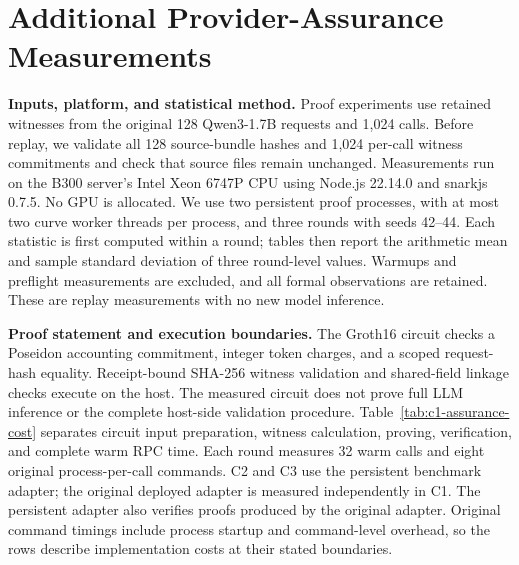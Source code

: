 \section{Additional Provider-Assurance Measurements}
\label{app:c-assurance}

\noindent\textbf{Inputs, platform, and statistical method.}
Proof experiments use retained witnesses from the original 128 Qwen3-1.7B
requests and 1,024 calls. Before replay, we validate all 128 source-bundle
hashes and 1,024 per-call witness commitments and check that source files
remain unchanged. Measurements run on the B300 server's Intel Xeon 6747P
CPU using Node.js 22.14.0 and snarkjs 0.7.5. No GPU is allocated.
We use two persistent proof processes, with at most two curve worker
threads per process, and three rounds with seeds 42--44.
Each statistic is first computed within a round; tables then report the
arithmetic mean and sample standard deviation of three round-level values.
Warmups and preflight measurements are excluded, and all formal observations
are retained. These are replay measurements with no new model inference.

\noindent\textbf{Proof statement and execution boundaries.}
The Groth16 circuit checks a Poseidon accounting commitment, integer token
charges, and a scoped request-hash equality. Receipt-bound SHA-256 witness
validation and shared-field linkage checks execute on the host.
The measured circuit does not prove full LLM inference or the complete
host-side validation procedure.
Table~\ref{tab:c1-assurance-cost} separates circuit input preparation,
witness calculation, proving, verification, and complete warm RPC time.
Each round measures 32 warm calls and eight original process-per-call
commands. C2 and C3 use the persistent benchmark adapter; the original
deployed adapter is measured independently in C1. The persistent adapter
also verifies proofs produced by the original adapter. Original command
timings include process startup and command-level overhead, so the rows
describe implementation costs at their stated boundaries.


